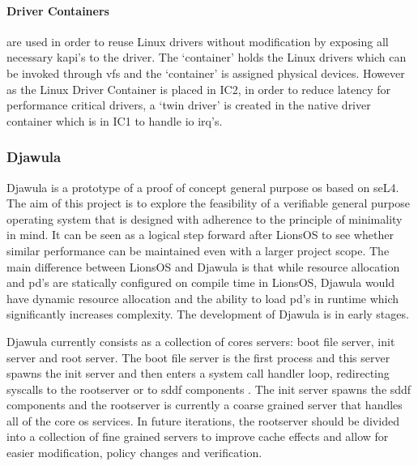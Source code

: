 \documentclass[literature_review.tex]{subfiles}
\begin{document}
\paragraph{Driver Containers} are used in order to reuse Linux drivers without modification by exposing all necessary k\gls{api}'s to the driver. The `container' holds the Linux drivers which can be invoked through \gls{vfs} and the `container' is assigned physical devices. However as the Linux Driver Container is placed in IC2, in order to reduce latency for performance critical drivers, a `twin driver' is created in the native driver container which is in IC1 to handle \gls{io} \gls{irq}'s.  

\subsubsection{Djawula}
Djawula is a prototype of a proof of concept general purpose \gls{os} based on seL4. The aim of this project is to explore the feasibility of a verifiable general purpose operating system that is designed with adherence to the principle of minimality in mind. It can be seen as a logical step forward after LionsOS \citep{Heiser_VCJGNLDZAZWPDB_25} to see whether similar performance can be maintained even with a larger project scope. The main difference between LionsOS and Djawula is that while resource allocation and \gls{pd}'s are statically configured on compile time in LionsOS, Djawula would have dynamic resource allocation and the ability to load \gls{pd}'s in runtime which significantly increases complexity. The development of Djawula is in early stages.

Djawula currently consists as a collection of cores servers: boot file server, init server and root server. The boot file server is the first process and this server spawns the init server and then enters a system call handler loop, redirecting syscalls to the rootserver or to \gls{sddf} components \citep{Heiser_CBDP_24}. The init server spawns the \gls{sddf} components and the rootserver is currently a coarse grained server that handles all of the core \gls{os} services. In future iterations, the rootserver should be divided into a collection of fine grained servers to improve cache effects and allow for easier modification, policy changes and verification.
\end{document}
